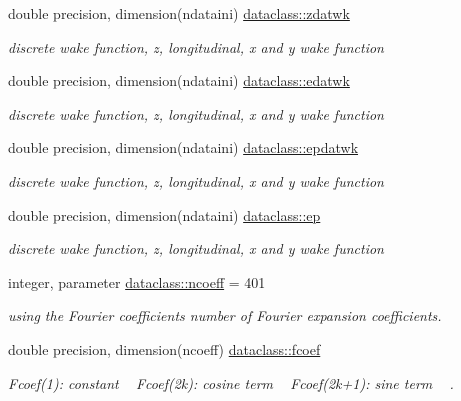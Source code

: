 \textbf{ }\par
\begin{DoxyCompactItemize}
\item 
double precision, dimension(ndataini) \mbox{\hyperlink{namespacedataclass_aedbb605bbae521fa94b55a592eaf5802}{dataclass\+::zdatwk}}
\begin{DoxyCompactList}\small\item\em discrete wake function, z, longitudinal, x and y wake function \end{DoxyCompactList}\item 
double precision, dimension(ndataini) \mbox{\hyperlink{namespacedataclass_aa19cbc20e7c55cc7625fe414eb6283d7}{dataclass\+::edatwk}}
\begin{DoxyCompactList}\small\item\em discrete wake function, z, longitudinal, x and y wake function \end{DoxyCompactList}\item 
double precision, dimension(ndataini) \mbox{\hyperlink{namespacedataclass_a0efc01b23a17c274db7c427517e41e22}{dataclass\+::epdatwk}}
\begin{DoxyCompactList}\small\item\em discrete wake function, z, longitudinal, x and y wake function \end{DoxyCompactList}\item 
double precision, dimension(ndataini) \mbox{\hyperlink{namespacedataclass_ab79752b3c2a7160b76ff3430350e23e3}{dataclass\+::ep}}
\begin{DoxyCompactList}\small\item\em discrete wake function, z, longitudinal, x and y wake function \end{DoxyCompactList}\end{DoxyCompactItemize}

\textbf{ }\par
\begin{DoxyCompactItemize}
\item 
integer, parameter \mbox{\hyperlink{namespacedataclass_aea44837b0eb59e9b5a864f3a59c7facc}{dataclass\+::ncoeff}} = 401
\begin{DoxyCompactList}\small\item\em using the Fourier coefficients number of Fourier expansion coefficients. \end{DoxyCompactList}\item 
double precision, dimension(ncoeff) \mbox{\hyperlink{namespacedataclass_ac8605e11e3fc14fbebbc843cc36c2836}{dataclass\+::fcoef}}
\begin{DoxyCompactList}\small\item\em Fcoef(1)\+: constant ~\newline
 Fcoef(2k)\+: cosine term ~\newline
 Fcoef(2k+1)\+: sine term ~\newline
. \end{DoxyCompactList}\end{DoxyCompactItemize}

